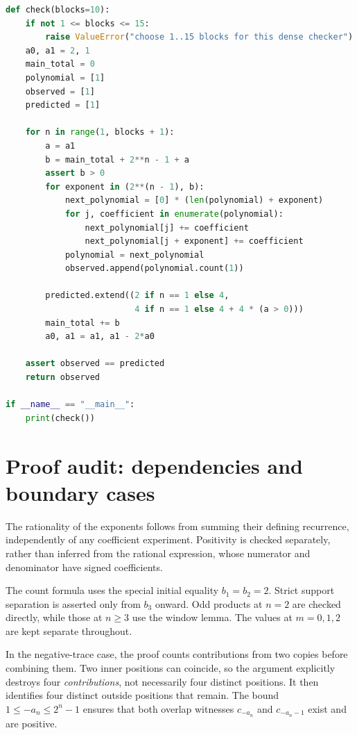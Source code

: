 \documentclass[11pt]{article}
\theoremstyle{definition}\newtheorem{definition}[theorem]{Definition}
\theoremstyle{remark}\newtheorem{remark}[theorem]{Remark}
\begin{document}
\begin{lstlisting}[language=Python]
def check(blocks=10):
    if not 1 <= blocks <= 15:
        raise ValueError("choose 1..15 blocks for this dense checker")
    a0, a1 = 2, 1
    main_total = 0
    polynomial = [1]
    observed = [1]
    predicted = [1]

    for n in range(1, blocks + 1):
        a = a1
        b = main_total + 2**n - 1 + a
        assert b > 0
        for exponent in (2**(n - 1), b):
            next_polynomial = [0] * (len(polynomial) + exponent)
            for j, coefficient in enumerate(polynomial):
                next_polynomial[j] += coefficient
                next_polynomial[j + exponent] += coefficient
            polynomial = next_polynomial
            observed.append(polynomial.count(1))

        predicted.extend((2 if n == 1 else 4,
                          4 if n == 1 else 4 + 4 * (a > 0)))
        main_total += b
        a0, a1 = a1, a1 - 2*a0

    assert observed == predicted
    return observed

if __name__ == "__main__":
    print(check())
\end{lstlisting}

\section{Proof audit: dependencies and boundary cases}

The rationality of the exponents follows from summing their defining recurrence, independently of any coefficient experiment. Positivity is checked separately, rather than inferred from the rational expression, whose numerator and denominator have signed coefficients.

The count formula uses the special initial equality $b_1=b_2=2$. Strict support separation is asserted only from $b_3$ onward. Odd products at $n=2$ are checked directly, while those at $n\geq3$ use the window lemma. The values at $m=0,1,2$ are kept separate throughout.

In the negative-trace case, the proof counts contributions from two copies before combining them. Two inner positions can coincide, so the argument explicitly destroys four \emph{contributions}, not necessarily four distinct positions. It then identifies four distinct outside positions that remain. The bound $1\leq -a_n\leq2^n-1$ ensures that both overlap witnesses $c_{-a_n}$ and $c_{-a_n-1}$ exist and are positive.
\end{document}
